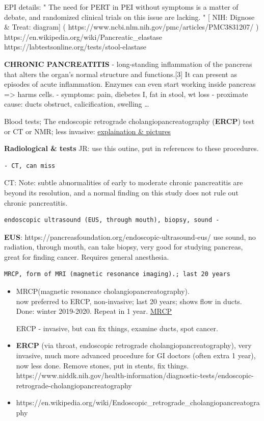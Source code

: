 EPI details: " The need for PERT in PEI without symptoms is a matter of
debate, and randomized clinical trials on this issue are lacking. " {[}
NIH: Dignose \& Treat: diagram{]} (
https://www.ncbi.nlm.nih.gov/pmc/articles/PMC3831207/ )
https://en.wikipedia.org/wiki/Pancreatic\_elastase
https://labtestsonline.org/tests/stool-elastase

\textbf{CHRONIC PANCREATITIS} - long-standing inflammation of the
pancreas that alters the organ's normal structure and functions.{[}3{]}
It can present as episodes of acute inflammation. Enzymes can even start
working inside pancreas =\textgreater{} harms cells. - symptoms: pain,
diebetes I, fat in stool, wt loss - proximate cause: ducts obstruct,
calicification, swelling \ldots{}

Blood tests; The endoscopic retrograde cholangiopancreatography
(\textbf{ERCP}) test or CT or NMR; less invasive:
\href{https://www.ncbi.nlm.nih.gov/pmc/articles/PMC3292642/}{explaination
\& pictures}

\textbf{Radiological \& tests} JR: use this outine, put in references to
these procedures.

\begin{verbatim}
- CT, can miss
\end{verbatim}

CT: Note: subtle abnormalities of early to moderate chronic pancreatitis
are beyond its resolution, and a normal finding on this study does not
rule out chronic pancreatitis.

\begin{verbatim}
endoscopic ultrasound (EUS, through mouth), biopsy, sound - 
\end{verbatim}

\textbf{EUS}: https://pancreasfoundation.org/endoscopic-ultrasound-eus/
use sound, no radiation, through mouth, can take biopsy, very good for
studying pancreas, great for finding cancer. Requires general
anesthesia.

\begin{verbatim}
MRCP, form of MRI (magnetic resonance imaging).; last 20 years
\end{verbatim}

\begin{itemize}
\item
  MRCP(magnetic resonance cholangiopancreatography).\\
  now preferred to ERCP, non-invasive; last 20 years; shows flow in
  ducts. Done: winter 2019-2020. Repeat in 1 year.
  \href{https://en.wikipedia.org/wiki/Magnetic_resonance_cholangiopancreatography}{MRCP}

  ERCP - invasive, but can fix things, examine ducts, spot cancer.
\item
  \textbf{ERCP} (via throat, endoscopic retrograde
  cholangiopancreatography), very invasive, much more advanced procedure
  for GI doctors (often extra 1 year), now less done. Remove stones, put
  in stents, fix things.
  https://www.niddk.nih.gov/health-information/diagnostic-tests/endoscopic-retrograde-cholangiopancreatography
\item
  https://en.wikipedia.org/wiki/Endoscopic\_retrograde\_cholangiopancreatography
\end{itemize}

